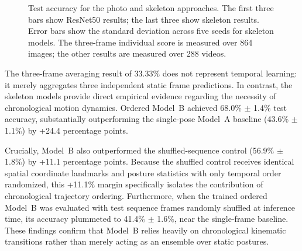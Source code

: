 \documentclass[12pt,a4paper]{article}
\begin{document}
\vspace{0.6em}
\begin{figure}[H]
\centering
{}
\caption{Test accuracy for the photo and skeleton approaches. The first three bars show ResNet50 results; the last three show skeleton results. Error bars show the standard deviation across five seeds for skeleton models. The three-frame individual score is measured over 864 images; the other results are measured over 288 videos.}
\label{fig:test-bars}
\end{figure}

The three-frame averaging result of 33.33\% does not represent temporal learning: it merely aggregates three independent static frame predictions. In contrast, the skeleton models provide direct empirical evidence regarding the necessity of chronological motion dynamics. Ordered Model~B achieved 68.0\% $\pm$ 1.4\% test accuracy, substantially outperforming the single-pose Model~A baseline (43.6\% $\pm$ 1.1\%) by +24.4 percentage points. 

Crucially, Model~B also outperformed the shuffled-sequence control (56.9\% $\pm$ 1.8\%) by +11.1 percentage points. Because the shuffled control receives identical spatial coordinate landmarks and posture statistics with only temporal order randomized, this +11.1\% margin specifically isolates the contribution of chronological trajectory ordering. Furthermore, when the trained ordered Model~B was evaluated with test sequence frames randomly shuffled at inference time, its accuracy plummeted to 41.4\% $\pm$ 1.6\%, near the single-frame baseline. These findings confirm that Model~B relies heavily on chronological kinematic transitions rather than merely acting as an ensemble over static postures.
\end{document}
